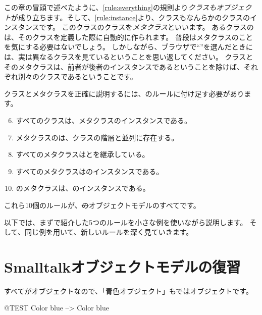 \documentclass[a4paper,10pt,twoside]{book}
\begin{document}
この章の冒頭で述べたように、\ref{rule:everything}の規則より\emph{クラスもオブジェクト}が成り立ちます。そして、\ref{rule:instance}より、クラスもなんらかのクラスのインスタンスです。
このクラスのクラスを\emph{メタクラス}といいます。
あるクラスのは、そのクラスを定義した際に自動的に作られます。
普段はメタクラスのことを気にする必要はないでしょう。
しかしながら、ブラウザで``''を選んだときには、実は異なるクラスを見ているということを思い返してください。
クラスとそのメタクラスは、前者が後者のインスタンスであるということを除けば、それぞれ別々のクラスであるということです。

クラスとメタクラスを正確に説明するには、のルールに付け足す必要があります。

\begin{enumerate}[label={\textbf{Rule \arabic{*}}.}, ref={Rule \arabic{*}}, leftmargin=*, widest=10]
\setcounter{enumi}{5}
\item{} 
	すべてのクラスは、メタクラスのインスタンスである。

\item{} 
	メタクラスのは、クラスの階層と並列に存在する。

\item{} 
	すべてのメタクラスはとを継承している。

\item{} 
	すべてのメタクラスはのインスタンスである。

\item{} 
	のメタクラスは、のインスタンスである。

\end{enumerate}

\noindent
これら10個のルールが、\st のオブジェクトモデルのすべてです。

以下では、まずで紹介した5つのルールを小さな例を使いながら説明します。
そして、同じ例を用いて、新しいルールを深く見ていきます。

\section{Smalltalkオブジェクトモデルの復習}

すべてがオブジェクトなので、「青色オブジェクト」も\st ではオブジェクトです。
\begin{code}{@TEST}
Color blue --> Color blue
\end{code}
\end{document}
